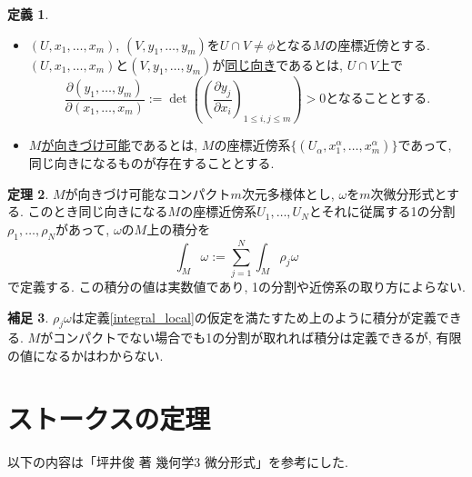 \documentclass[dvipdfmx,a4paper,11pt]{article}
\theoremstyle{definition}
\newtheorem{thm}{定理}
\newtheorem{dfn}[thm]{定義}
\newtheorem{rem}[thm]{補足}
\newcommand{\pdrv}[2]{\frac{\partial #1}{\partial #2}}
\begin{document}
 \begin{tcolorbox}[
    colback = white,
    colframe = green!35!black,
    fonttitle = \bfseries,
    breakable = true]
\begin{dfn}

\begin{itemize}
 \setlength{\parskip}{0cm}
  \setlength{\itemsep}{2pt} 
\item $(U, x_1, \ldots, x_m)$, $(V, y_1, \ldots, y_m)$を$U \cap V \neq \phi$となる$M$の座標近傍とする.
$(U, x_1, \ldots, x_m)$と$(V, y_1, \ldots, y_m)$が\underline{同じ向き}であるとは, $U \cap V$上で
$$
\pdrv{(y_1, \ldots, y_m)}{(x_1, \ldots, x_m)}:=\det(\left( \pdrv{y_j}{x_i} \right)_{1\le i,j \le m}) >0
\text{となることとする.}
$$
\item \underline{$M$が向きづけ可能}であるとは, $M$の座標近傍系$\{ (U_{\alpha}, x_{1}^{\alpha}, \ldots, x_{m}^{\alpha})\}$であって, 同じ向きになるものが存在することとする.
\end{itemize}
    \end{dfn}
    \end{tcolorbox} 

  \begin{tcolorbox}[
    colback = white,
    colframe = green!35!black,
    fonttitle = \bfseries,
    breakable = true]
\begin{thm}
$M$が向きづけ可能なコンパクト$m$次元多様体とし, $\omega$を$m$次微分形式とする.
このとき同じ向きになる$M$の座標近傍系$U_1, \ldots, U_N$とそれに従属する1の分割$\rho_{1}, \ldots, \rho_{N}$があって,
$\omega$の$M$上の積分を
$$
\int_{M} \omega := \sum_{j=1}^{N} \int_{M} \rho_j \omega
$$
で定義する. この積分の値は実数値であり, 1の分割や近傍系の取り方によらない. 
    \end{thm}
    \end{tcolorbox} 

\begin{rem}
 $\rho_j \omega$は定義\ref{integral_local}の仮定を満たすため上のように積分が定義できる. 
$M$がコンパクトでない場合でも1の分割が取れれば積分は定義できるが, 有限の値になるかはわからない. 
\end{rem}

 \section{ストークスの定理}
 以下の内容は「坪井俊 著 幾何学3 微分形式」を参考にした.
\end{document}
